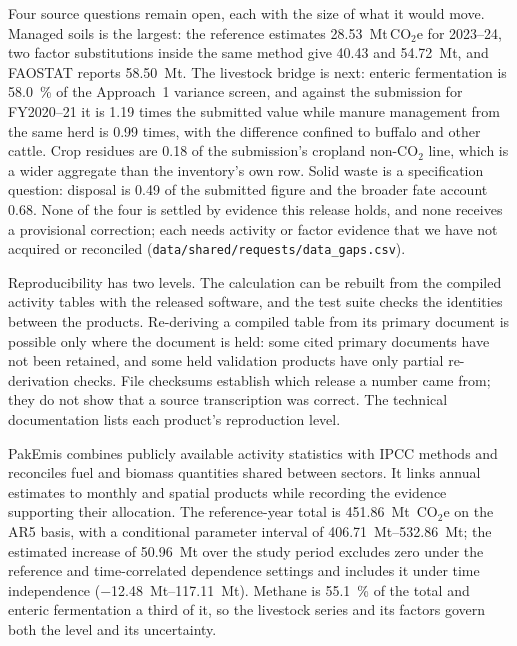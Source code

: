 \documentclass[essd,manuscript]{copernicus}
\begin{document}
Four source questions remain open, each with the size of what it would move. Managed soils is the largest: the reference estimates \SI{28.53}{\mega\tonne}\,CO$_2$e for 2023--24, two factor substitutions inside the same method give \SI{40.43}{} and \SI{54.72}{\mega\tonne}, and FAOSTAT reports \SI{58.50}{\mega\tonne}. The livestock bridge is next: enteric fermentation is \SI{58.0}{\percent} of the Approach~1 variance screen, and against the submission for FY2020--21 it is \num{1.19} times the submitted value while manure management from the same herd is \num{0.99} times, with the difference confined to buffalo and other cattle. Crop residues are \num{0.18} of the submission's cropland non-CO$_2$ line, which is a wider aggregate than the inventory's own row. Solid waste is a specification question: disposal is \num{0.49} of the submitted figure and the broader fate account \num{0.68}. None of the four is settled by evidence this release holds, and none receives a provisional correction; each needs activity or factor evidence that we have not acquired or reconciled (\texttt{data/shared/requests/data\_gaps.csv}).

Reproducibility has two levels. The calculation can be rebuilt from the compiled activity tables with the released software, and the test suite checks the identities between the products. Re-deriving a compiled table from its primary document is possible only where the document is held: some cited primary documents have not been retained, and some held validation products have only partial re-derivation checks. File checksums establish which release a number came from; they do not show that a source transcription was correct. The technical documentation lists each product's reproduction level.

\FloatBarrier
\conclusions

PakEmis combines publicly available activity statistics with IPCC methods and reconciles fuel and biomass quantities shared between sectors. It links annual estimates to monthly and spatial products while recording the evidence supporting their allocation. The reference-year total is \SI{451.86}{\mega\tonne}~CO$_2$e on the AR5 basis, with a conditional parameter interval of \SIrange{406.71}{532.86}{\mega\tonne}; the estimated increase of \SI{50.96}{\mega\tonne} over the study period excludes zero under the reference and time-correlated dependence settings and includes it under time independence (\SIrange{-12.48}{117.11}{\mega\tonne}). Methane is \SI{55.1}{\percent} of the total and enteric fermentation a third of it, so the livestock series and its factors govern both the level and its uncertainty.
\end{document}
